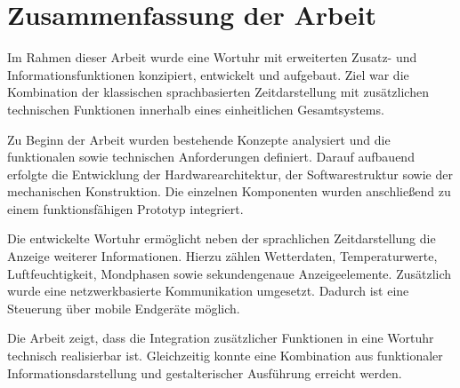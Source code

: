 \section{Zusammenfassung der Arbeit} 
Im Rahmen dieser Arbeit wurde eine Wortuhr mit erweiterten Zusatz- und Informationsfunktionen konzipiert, entwickelt und aufgebaut. 
Ziel war die Kombination der klassischen sprachbasierten Zeitdarstellung mit zusätzlichen technischen Funktionen innerhalb eines einheitlichen Gesamtsystems.

Zu Beginn der Arbeit wurden bestehende Konzepte analysiert und die funktionalen sowie technischen Anforderungen definiert. 
Darauf aufbauend erfolgte die Entwicklung der Hardwarearchitektur, der Softwarestruktur sowie der mechanischen Konstruktion. 
Die einzelnen Komponenten wurden anschließend zu einem funktionsfähigen Prototyp integriert.

Die entwickelte Wortuhr ermöglicht neben der sprachlichen Zeitdarstellung die Anzeige weiterer Informationen. 
Hierzu zählen Wetterdaten, Temperaturwerte, Luftfeuchtigkeit, Mondphasen sowie sekundengenaue Anzeigeelemente. 
Zusätzlich wurde eine netzwerkbasierte Kommunikation umgesetzt. 
Dadurch ist eine Steuerung über mobile Endgeräte möglich.

Die Arbeit zeigt, dass die Integration zusätzlicher Funktionen in eine Wortuhr technisch realisierbar ist. 
Gleichzeitig konnte eine Kombination aus funktionaler Informationsdarstellung und gestalterischer Ausführung erreicht werden.